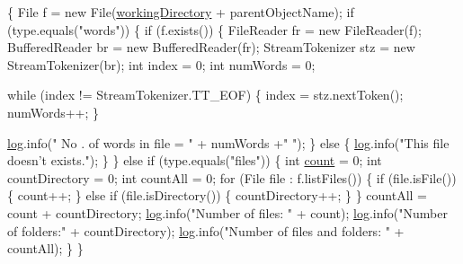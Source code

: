 \begin{DoxyCode}
                                            \{
        File f = \textcolor{keyword}{new} File(\hyperlink{classcom_1_1poly_1_1nlp_1_1filekommander_1_1file_1_1actions_1_1_file_action_utils_ad54a8fdc9145d2f423c54cb1597f874a}{workingDirectory} + parentObjectName);
        \textcolor{keywordflow}{if} (type.equals(\textcolor{stringliteral}{"words"})) \{
            \textcolor{keywordflow}{if} (f.exists()) \{
                FileReader fr = \textcolor{keyword}{new} FileReader(f);
                BufferedReader br = \textcolor{keyword}{new} BufferedReader(fr);
                StreamTokenizer stz = \textcolor{keyword}{new} StreamTokenizer(br);
                \textcolor{keywordtype}{int} index = 0;
                \textcolor{keywordtype}{int} numWords = 0;

                \textcolor{keywordflow}{while} (index != StreamTokenizer.TT\_EOF) \{
                    index = stz.nextToken();
                    numWords++;
                \}

                \hyperlink{classcom_1_1poly_1_1nlp_1_1filekommander_1_1file_1_1actions_1_1_file_action_utils_a7af6d26171248a2e7253d9bce1b287cc}{log}.info(\textcolor{stringliteral}{" No . of words in file = "} + numWords +\textcolor{stringliteral}{" "});
            \} \textcolor{keywordflow}{else} \{
                \hyperlink{classcom_1_1poly_1_1nlp_1_1filekommander_1_1file_1_1actions_1_1_file_action_utils_a7af6d26171248a2e7253d9bce1b287cc}{log}.info(\textcolor{stringliteral}{"This file doesn't exists."});
            \}
        \} \textcolor{keywordflow}{else} \textcolor{keywordflow}{if} (type.equals(\textcolor{stringliteral}{"files"})) \{
            \textcolor{keywordtype}{int} \hyperlink{classcom_1_1poly_1_1nlp_1_1filekommander_1_1file_1_1actions_1_1_file_action_utils_a2df1aca8a703f77ff7ca700541d6fb6b}{count} = 0;
            \textcolor{keywordtype}{int} countDirectory = 0;
            \textcolor{keywordtype}{int} countAll = 0;
            \textcolor{keywordflow}{for} (File file : f.listFiles()) \{
                \textcolor{keywordflow}{if} (file.isFile()) \{
                    count++;
                \} \textcolor{keywordflow}{else} \textcolor{keywordflow}{if} (file.isDirectory()) \{
                    countDirectory++;
                \}
            \}
            countAll = count + countDirectory;
            \hyperlink{classcom_1_1poly_1_1nlp_1_1filekommander_1_1file_1_1actions_1_1_file_action_utils_a7af6d26171248a2e7253d9bce1b287cc}{log}.info(\textcolor{stringliteral}{"Number of files: "} + count);
            \hyperlink{classcom_1_1poly_1_1nlp_1_1filekommander_1_1file_1_1actions_1_1_file_action_utils_a7af6d26171248a2e7253d9bce1b287cc}{log}.info(\textcolor{stringliteral}{"Number of folders:"} + countDirectory);
            \hyperlink{classcom_1_1poly_1_1nlp_1_1filekommander_1_1file_1_1actions_1_1_file_action_utils_a7af6d26171248a2e7253d9bce1b287cc}{log}.info(\textcolor{stringliteral}{"Number of files and folders: "} + countAll);
        \}
    \}
\end{DoxyCode}
